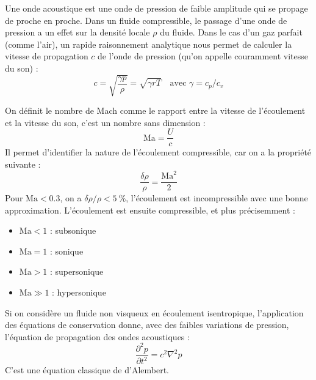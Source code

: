 
Une onde acoustique est une onde de pression de faible amplitude qui se propage de proche en proche. Dans un fluide compressible, le passage d'une onde de pression a un effet sur la densité locale $\rho$ du fluide. Dans le cas d'un gaz parfait (comme l'air), un rapide raisonnement analytique nous permet de calculer la vitesse de propagation $c$ de l'onde de pression (qu'on appelle couramment vitesse du son) :
%
\begin{equation}
    c = \sqrt{\frac{\gamma p}{\rho}} = \sqrt{\gamma r T}
    \quad \text{avec } \gamma = c_p / c_v
\end{equation}

On définit le nombre de Mach comme le rapport entre la vitesse de l'écoulement et la vitesse du son, c'est un nombre sans dimension :
%
\begin{equation}
    \mathrm{Ma} = \frac{U}{c}
\end{equation}
%
Il permet d'identifier la nature de l'écoulement compressible, car on a la propriété suivante :
%
\begin{equation}
    \frac{\delta \rho}{\rho} = \frac{{\mathrm{Ma}}^2}{2}
\end{equation}
%
Pour $\mathrm{Ma} < \num{0.3}$, on a $\delta \rho / \rho < \SI{5}{\percent}$, l'écoulement est incompressible avec une bonne approximation. L'écoulement est ensuite compressible, et plus précisemment :
%
\begin{itemize}
    \item $\mathrm{Ma} < 1$ : subsonique
    \item $\mathrm{Ma} = 1$ : sonique
    \item $\mathrm{Ma} > 1$ : supersonique
    \item $\mathrm{Ma} \gg 1$ : hypersonique
\end{itemize}

Si on considère un fluide non visqueux en écoulement isentropique, l'application des équations de conservation donne, avec des faibles variations de pression, l'équation de propagation des ondes acoustiques :
%
\begin{equation}
    \frac{\partial^2 p}{\partial t^2} = c^2 \nabla^2 p
\end{equation}
%
C'est une équation classique de d'Alembert.

